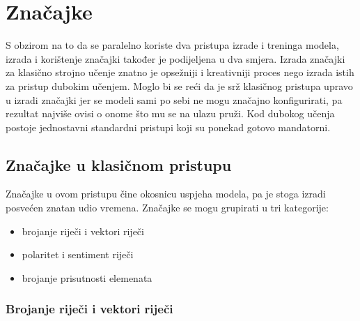\documentclass[times, utf8, zavrsni]{fer}
\begin{document}
\section{Značajke}

S obzirom na to da se paralelno koriste dva pristupa izrade i treninga modela, izrada i korištenje značajki također je podijeljena u dva smjera. Izrada značajki za klasično strojno učenje znatno je opsežniji i kreativniji proces nego izrada istih za pristup dubokim učenjem. Moglo bi se reći da je srž klasičnog pristupa upravo u izradi značajki jer se modeli sami po sebi ne mogu značajno konfigurirati, pa rezultat najviše ovisi o onome što mu se na ulazu pruži. Kod dubokog učenja postoje jednostavni standardni pristupi koji su ponekad gotovo mandatorni. 


\subsection{Značajke u klasičnom pristupu}

Značajke u ovom pristupu čine okosnicu uspjeha modela, pa je stoga izradi posvećen znatan udio vremena. Značajke se mogu grupirati u tri kategorije: \begin{itemize}
\item brojanje riječi i vektori riječi
\item polaritet i sentiment riječi
\item brojanje prisutnosti elemenata
\end{itemize}

\subsubsection{Brojanje riječi i vektori riječi}
\end{document}
